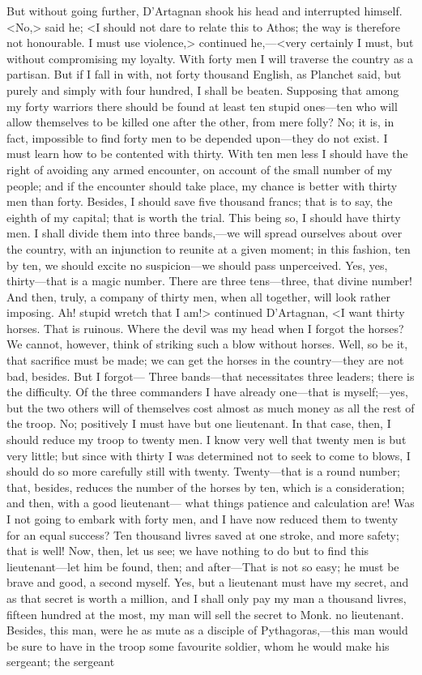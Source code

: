 But without going further, D'Artagnan shook his head and interrupted himself. <No,> said he; <I should not dare to relate this to Athos; the way is therefore not honourable. I must use violence,> continued he,—<very certainly I must, but without compromising my loyalty. With forty men I will traverse the country as a partisan. But if I fall in with, not forty thousand English, as Planchet said, but purely and simply with four hundred, I shall be beaten. Supposing that among my forty warriors there should be found at least ten stupid ones—ten who will allow themselves to be killed one after the other, from mere folly? No; it is, in fact, impossible to find forty men to be depended upon—they do not exist. I must learn how to be contented with thirty. With ten men less I should have the right of avoiding any armed encounter, on account of the small number of my people; and if the encounter should take place, my chance is better with thirty men than forty. Besides, I should save five thousand francs; that is to say, the eighth of my capital; that is worth the trial. This being so, I should have thirty men. I shall divide them into three bands,—we will spread ourselves about over the country, with an injunction to reunite at a given moment; in this fashion, ten by ten, we should excite no suspicion—we should pass unperceived. Yes, yes, thirty—that is a magic number. There are three tens—three, that divine number! And then, truly, a company of thirty men, when all together, will look rather imposing. Ah! stupid wretch that I am!> continued D'Artagnan, <I want thirty horses. That is ruinous. Where the devil was my head when I forgot the horses? We cannot, however, think of striking such a blow without horses. Well, so be it, that sacrifice must be made; we can get the horses in the country—they are not bad, besides. But I forgot— Three bands—that necessitates three leaders; there is the difficulty. Of the three commanders I have already one—that is myself;—yes, but the two others will of themselves cost almost as much money as all the rest of the troop. No; positively I must have but one lieutenant. In that case, then, I should reduce my troop to twenty men. I know very well that twenty men is but very little; but since with thirty I was determined not to seek to come to blows, I should do so more carefully still with twenty. Twenty—that is a round number; that, besides, reduces the number of the horses by ten, which is a consideration; and then, with a good lieutenant— what things patience and calculation are! Was I not going to embark with forty men, and I have now reduced them to twenty for an equal success? Ten thousand livres saved at one stroke, and more safety; that is well! Now, then, let us see; we have nothing to do but to find this lieutenant—let him be found, then; and after—That is not so easy; he must be brave and good, a second myself. Yes, but a lieutenant must have my secret, and as that secret is worth a million, and I shall only pay my man a thousand livres, fifteen hundred at the most, my man will sell the secret to Monk.  no lieutenant. Besides, this man, were he as mute as a disciple of Pythagoras,—this man would be sure to have in the troop some favourite soldier, whom he would make his sergeant; the sergeant 